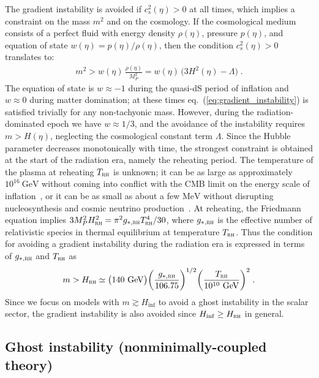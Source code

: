 \documentclass[11pt,a4paper]{article}
\newcommand{\ba}[1]{\begin{align} #1 \end{align}}
\newcommand{\Mpl}{M_P}
\newcommand{\eref}[1]{eq.~(\ref{#1})}
\begin{document}
The gradient instability is avoided if $c_s^2(\eta) > 0$ at all times, which implies a constraint on the mass $m^2$ and on the cosmology.  
If the cosmological medium consists of a perfect fluid with energy density $\rho(\eta)$, pressure $p(\eta)$, and equation of state $w(\eta) = p(\eta)/\rho(\eta)$, then the condition $c_s^2(\eta) > 0$ translates to:
\ba{\label{eq:gradient_instability}
    m^2 > w(\eta) \,  
    \frac{\rho(\eta)}{\Mpl^2} = w(\eta) \, \bigl( 3 H^2(\eta) - \Lambda \bigr)
    \;.
}
The equation of state is $w \approx -1$ during the quasi-dS period of inflation and $w \approx 0$ during matter domination; at these times \eref{eq:gradient_instability} is satisfied trivially for any non-tachyonic mass. However, during the radiation-dominated epoch we have $w \approx 1/3$, and the avoidance of the instability requires $m > H(\eta)$, neglecting the cosmological constant term $\Lambda$. 
Since the Hubble parameter decreases monotonically with time, the strongest constraint is obtained at the start of the radiation era, namely the reheating period.  The temperature of the plasma at reheating $T_\text{\sc rh}$ is unknown; it can be as large as approximately $10^{16} \ \mathrm{GeV}$ without coming into conflict with the CMB limit on the energy scale of inflation~\cite{Cook:2015vqa}, or it can be as small as about a few $\mathrm{MeV}$ without disrupting nucleosynthesis and cosmic neutrino production~\cite{deSalas:2015glj}.  At reheating, the Friedmann equation implies $3 \Mpl^2 H_\text{\sc rh}^2 = \pi^2 g_{\ast,\text{\sc rh}} T_\text{\sc rh}^4 / 30$, where $g_{\ast,\text{\sc rh}}$ is the effective number of relativistic species in thermal equilibrium at temperature $T_\text{\sc rh}$.  Thus the condition for avoiding a gradient instability during the radiation era is expressed in terms of $g_{\ast,\text{\sc rh}}$ and $T_\text{\sc rh}$ as
\ba{
    m > H_\text{\sc rh} \simeq \bigl( 140 \ \mathrm{GeV} \bigr) \biggl( \frac{g_{\ast,\text{\sc rh}}}{106.75} \biggr)^{1/2} \biggl( \frac{T_\text{\sc rh}}{10^{10} \ \mathrm{GeV}} \biggr)^2
    \;.
}
Since we focus on models with $m \gtrsim H_\mathrm{inf}$ to avoid a ghost instability in the scalar sector, the gradient instability is also avoided since $H_\mathrm{inf} \geq H_\text{\sc rh}$ in general.  

\subsection{Ghost instability (nonminimally-coupled theory)}
\label{sub:model2_ghost_instability}
\end{document}
